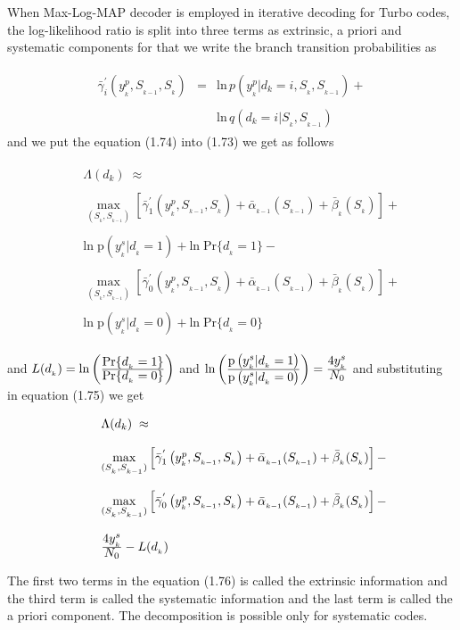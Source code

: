 When Max-Log-MAP decoder is employed in iterative decoding for Turbo codes, the log-likelihood ratio is split into three terms as extrinsic, a priori and systematic components for that we write the branch transition probabilities as

\begin{eqnarray}
\begin{array}{lll}
\bar{\gamma}_i^{'}\left(y_{_{k}}^p,S_{_{k-1}},S_{_{k}}\right)&=&\mathrm{ln}\,p\left(y_{_{k}}^p\vert d_k=i,S_{_{k}},S_{_{k-1}}\right)+ \\ \\
&&\mathrm{ln}\,q (d_k=i\vert S_{_{k}},S_{_{k-1}})
\end{array}
\end{eqnarray}
and we put the equation (1.74) into (1.73) we get as follows

\begin{eqnarray}
\begin{array}{lll}
&&\Lambda(d_k)\;\approx\\ \\
&&\max\limits_{(S_{_{k}},S_{_{k-1}})}\left[\bar{\gamma}^{'}_1\left(y_{_k}^p,S_{_{k-1}},S_{_{k}}\right)+\bar{\alpha}_{_{k-1}}(S_{_{k-1}})+\bar{\beta}_{_{k}}(S_{_{k}})\right ] + \\ \\
&&\mathrm{ln\;p}\left(y_{_{k}}^s\vert d_{_{k}}=1\right)+\mathrm{ln\;Pr}\{d_{_{k}}=1\}- \\ \\
&&\max\limits_{(S_{_{k}},S_{_{k-1}})}\left[\bar{\gamma}^{'}_0\left(y_{_k}^p,S_{_{k-1}},S_{_{k}}\right)+\bar{\alpha}_{_{k-1}}(S_{_{k-1}})+\bar{\beta}_{_{k}}(S_{_{k}})\right ] + \\ \\
&&\mathrm{ln\;p}\left(y_{_{k}}^s\vert d_{_{k}}=0\right)+\mathrm{ln\;Pr}\{d_{_{k}}=0\}
\end{array}
\end{eqnarray}

and $L(d_{_{k}})=\mathrm{ln}\left(\frac{\hbox{$\mathrm{Pr}\{d_{_{k}}=1\}$}}{\hbox{$\mathrm{Pr}\{d_{_{k}}=0\}$}}\right)$ and $\mathrm{ln}\left(\frac{\hbox{$\mathrm{p}\left(y_{_k}^s\vert d_{_k}=1\right)$}}{\hbox{$\mathrm{p}\left(y_{_k}^s\vert d_{_k}=0\right)$}}\right)=\frac{\hbox{$4y_{_{k}}^s$}}{\hbox{$N_0$}}$ and substituting in equation (1.75) we get

\begin{eqnarray}
\begin{array}{lll}
&&\Lambda(d_k)\;\approx\\ \\
&&\max\limits_{(S_{_{k}},S_{_{k-1}})}\left[\bar{\gamma}^{'}_1\left(y_{_k}^p,S_{_{k-1}},S_{_{k}}\right)+\bar{\alpha}_{_{k-1}}(S_{_{k-1}})+\bar{\beta}_{_{k}}(S_{_{k}})\right ] - \\ \\
&&\max\limits_{(S_{_{k}},S_{_{k-1}})}\left[\bar{\gamma}^{'}_0\left(y_{_k}^p,S_{_{k-1}},S_{_{k}}\right)+\bar{\alpha}_{_{k-1}}(S_{_{k-1}})+\bar{\beta}_{_{k}}(S_{_{k}})\right ] - \\ \\
&&\frac{\hbox{$4y_{_{k}}^s$}}{\hbox{$N_0$}}-L(d_{_{k}})
\end{array}
\end{eqnarray}

The first two terms in the equation (1.76) is called the extrinsic information and the third term is called the systematic information and the last term is called the a priori component. The decomposition is possible only for systematic codes.

